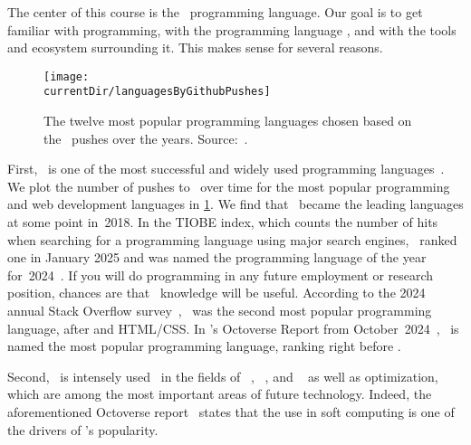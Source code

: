%
%
The center of this course is the \python\ programming language.
Our goal is to get familiar with programming, with the programming language \python, and with the tools and ecosystem surrounding it.
This makes sense for several reasons.%
%
\begin{figure}%
\centering%
\texttt{[image: \\currentDir/languagesByGithubPushes]}%
\caption{The twelve most popular programming languages chosen based on the \github\ pushes over the years. Source:~\cite{B2023G2GLS}.}%
\label{fig:languagesByGithubPushes}%
\end{figure}%

First, \python\ is one of the most successful and widely used programming languages~\cite{CBST2024LOHPPTDDSAMLA}.
We plot the number of pushes to \github\ over time for the most popular programming and web development languages in \cref{fig:languagesByGithubPushes}.
We find that \python\ became the leading languages at some point in~2018.
In the TIOBE index, which counts the number of hits when searching for a programming language using major search engines, \python\ ranked one in January 2025 and was named the programming language of the year for~2024~\cite{J2025TIFJ2JHPITPLOTY2}.%
%
%
%
If you will do programming in any future employment or research position, chances are that \python\ knowledge will be useful.
According to the 2024 annual Stack Overflow survey~\cite{Y2025DWMMMT2RFSOADS}, \python\ was the second most popular programming language, after  and HTML/CSS.
In \github's Octoverse Report from October~2024~\cite{GS2024OALPTTLATNOGDS}, \python\ is named the most popular programming language, ranking right before .

Second, \python\ is intensely used~\cite{CBST2024LOHPPTDDSAMLA} in the fields of ~\cite{RN2022AIAMA}, ~\cite{SSBD2014UMLFTTA}, and ~\cite{G2019DSFSFPWP} as well as optimization, which are among the most important areas of future technology.
Indeed, the aforementioned Octoverse report~\cite{GS2024OALPTTLATNOGDS} states that the use in soft computing is one of the drivers of \python's popularity.

